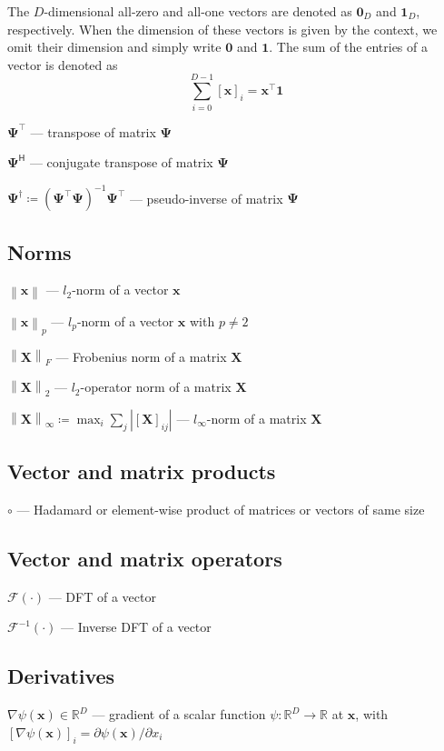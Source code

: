 \documentclass[a4paper,12pt,openany]{book}
\newcommand{\dict}{\boldsymbol{\Psi}}
\newcommand{\X}{\mathbf{X}}
\newcommand{\R}{\mathbb{R}}
\newcommand{\x}{\mathbf{x}}
\newcommand{\norm}[1]{\left\|#1\right\|}
\begin{document}
The $D$-dimensional all-zero and all-one vectors are denoted as $\mathbf{0}_D$ and $\mathbf{1}_D$, respectively. When the dimension of these vectors is given by the context, we omit their dimension and simply write $\mathbf{0}$ and $\mathbf{1}$. The sum of the entries of a vector is denoted as
\begin{equation}
	\sum_{i=0}^{D-1} [\x]_i = \x^\top\mathbf{1}
\end{equation}


$\dict^\top$ --- transpose of matrix $\dict$

$\dict^\mathsf{H}$ --- conjugate transpose of matrix $\dict$

$\dict^\dagger\coloneqq (\dict^\top\dict)^{-1}\dict^\top$ --- pseudo-inverse of matrix $\dict$

\subsection*{Norms}

$\norm{\x}$ --- $l_2$-norm of a vector $\x$

$\norm{\x}_p$ --- $l_p$-norm of a vector $\x$ with $p\neq 2$

$\norm{\X}_F$ --- Frobenius norm of a matrix $\X$

$\norm{\X}_2$ --- $l_2$-operator norm of a matrix $\X$

$\norm{\X}_\infty\coloneqq\max_i \sum_j |[\X]_{ij}|$ --- $l_\infty$-norm of a matrix $\X$

\subsection*{Vector and matrix products}

$\circ$ --- Hadamard or element-wise product of matrices or vectors of same size

\subsection*{Vector and matrix operators}

$\mathcal{F}(\cdot)$ --- DFT of a vector

$\mathcal{F}^{-1}(\cdot)$ --- Inverse DFT of a vector


\subsection*{Derivatives}

$\nabla \psi(\x)\in\R^D$ --- gradient of a scalar function $\psi:\R^D\rightarrow\R$ at $\x$, with $[\nabla \psi(\x)]_i = \partial \psi(\x)/\partial x_i$
\end{document}

